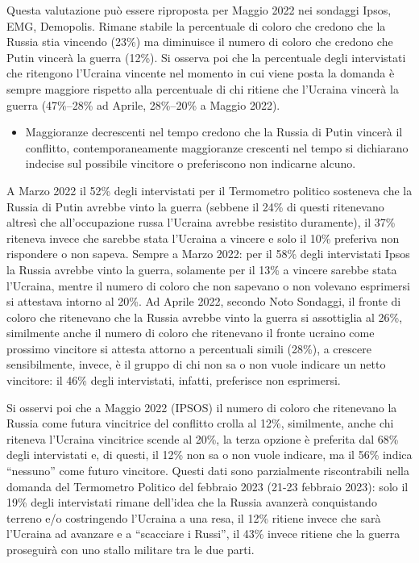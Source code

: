 \documentclass[
]{book}
\providecommand{\tightlist}{%
  \setlength{\itemsep}{0pt}\setlength{\parskip}{0pt}}
\begin{document}
Questa valutazione può essere riproposta per Maggio 2022 nei sondaggi Ipsos, EMG, Demopolis. Rimane stabile la percentuale di coloro che credono che la Russia stia vincendo (23\%) ma diminuisce il numero di coloro che credono che Putin vincerà la guerra (12\%). Si osserva poi che la percentuale degli intervistati che ritengono l'Ucraina vincente nel momento in cui viene posta la domanda è sempre maggiore rispetto alla percentuale di chi ritiene che l'Ucraina vincerà la guerra (47\%--28\% ad Aprile, 28\%--20\% a Maggio 2022).

\begin{itemize}
\tightlist
\item
  Maggioranze decrescenti nel tempo credono che la Russia di Putin vincerà il conflitto, contemporaneamente maggioranze crescenti nel tempo si dichiarano indecise sul possibile vincitore o preferiscono non indicarne alcuno.
\end{itemize}

A Marzo 2022 il 52\% degli intervistati per il Termometro politico sosteneva che la Russia di Putin avrebbe vinto la guerra (sebbene il 24\% di questi ritenevano altresì che all'occupazione russa l'Ucraina avrebbe resistito duramente), il 37\% riteneva invece che sarebbe stata l'Ucraina a vincere e solo il 10\% preferiva non rispondere o non sapeva. Sempre a Marzo 2022: per il 58\% degli intervistati Ipsos la Russia avrebbe vinto la guerra, solamente per il 13\% a vincere sarebbe stata l'Ucraina, mentre il numero di coloro che non sapevano o non volevano esprimersi si attestava intorno al 20\%. Ad Aprile 2022, secondo Noto Sondaggi, il fronte di coloro che ritenevano che la Russia avrebbe vinto la guerra si assottiglia al 26\%, similmente anche il numero di coloro che ritenevano il fronte ucraino come prossimo vincitore si attesta attorno a percentuali simili (28\%), a crescere sensibilmente, invece, è il gruppo di chi non sa o non vuole indicare un netto vincitore: il 46\% degli intervistati, infatti, preferisce non esprimersi.

Si osservi poi che a Maggio 2022 (IPSOS) il numero di coloro che ritenevano la Russia come futura vincitrice del conflitto crolla al 12\%, similmente, anche chi riteneva l'Ucraina vincitrice scende al 20\%, la terza opzione è preferita dal 68\% degli intervistati e, di questi, il 12\% non sa o non vuole indicare, ma il 56\% indica ``nessuno'' come futuro vincitore. Questi dati sono parzialmente riscontrabili nella domanda del Termometro Politico del febbraio 2023 (21-23 febbraio 2023): solo il 19\% degli intervistati rimane dell'idea che la Russia avanzerà conquistando terreno e/o costringendo l'Ucraina a una resa, il 12\% ritiene invece che sarà l'Ucraina ad avanzare e a ``scacciare i Russi'', il 43\% invece ritiene che la guerra proseguirà con uno stallo militare tra le due parti.
\end{document}
